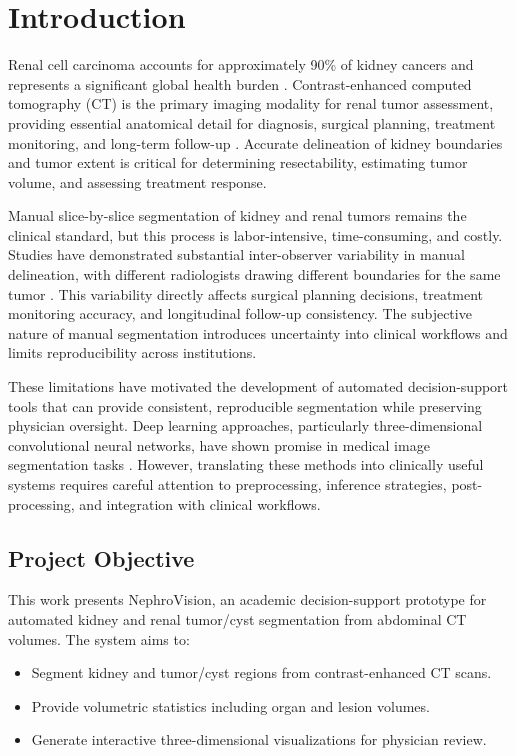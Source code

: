 \section{Introduction}

Renal cell carcinoma accounts for approximately 90\% of kidney cancers and represents a significant global health burden \cite{renal_cancer_stats}. Contrast-enhanced computed tomography (CT) is the primary imaging modality for renal tumor assessment, providing essential anatomical detail for diagnosis, surgical planning, treatment monitoring, and long-term follow-up \cite{ct_imaging_kidney}. Accurate delineation of kidney boundaries and tumor extent is critical for determining resectability, estimating tumor volume, and assessing treatment response.

Manual slice-by-slice segmentation of kidney and renal tumors remains the clinical standard, but this process is labor-intensive, time-consuming, and costly. Studies have demonstrated substantial inter-observer variability in manual delineation, with different radiologists drawing different boundaries for the same tumor \cite{interobserver_variability}. This variability directly affects surgical planning decisions, treatment monitoring accuracy, and longitudinal follow-up consistency. The subjective nature of manual segmentation introduces uncertainty into clinical workflows and limits reproducibility across institutions.

These limitations have motivated the development of automated decision-support tools that can provide consistent, reproducible segmentation while preserving physician oversight. Deep learning approaches, particularly three-dimensional convolutional neural networks, have shown promise in medical image segmentation tasks \cite{unet3d, medical_segmentation_review}. However, translating these methods into clinically useful systems requires careful attention to preprocessing, inference strategies, post-processing, and integration with clinical workflows.

\subsection{Project Objective}

This work presents NephroVision, an academic decision-support prototype for automated kidney and renal tumor/cyst segmentation from abdominal CT volumes. The system aims to:
\begin{itemize}
    \item Segment kidney and tumor/cyst regions from contrast-enhanced CT scans.
    \item Provide volumetric statistics including organ and lesion volumes.
    \item Generate interactive three-dimensional visualizations for physician review.
\end{itemize}

